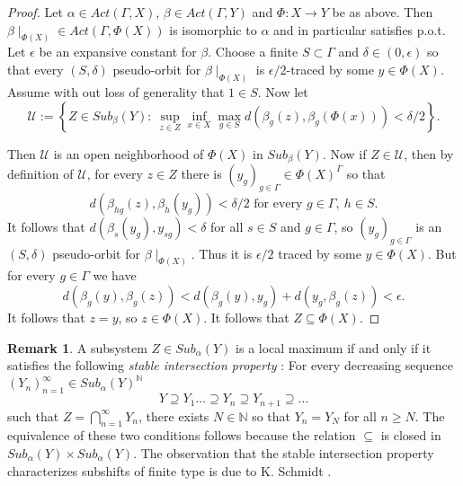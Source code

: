 \documentclass[oneside,english]{amsart}
\theoremstyle{definition}
\newtheorem{remark}[thm]{Remark}
\newcommand{\Act}[2]{\mathit{Act}({#1},{#2})}
\newcommand{\subG}[2]{\mathit{Sub}_{{#1}}({#2})}
\begin{document}
\begin{proof}
Let $\alpha \in \Act{\Gamma}{X}$, $\beta \in \Act{\Gamma}{Y}$ and $\Phi:X \to Y$ be as above.
Then $\beta\mid_{\Phi(X)} \in \Act{\Gamma}{\Phi(X)}$ is isomorphic to $\alpha$ and in particular satisfies p.o.t.
Let $\epsilon$ be an expansive constant for $\beta$. Choose  a finite $S \subset \Gamma$ and $\delta  \in (0,\epsilon)$ so that every $(S,\delta)$ pseudo-orbit for $\beta\mid_{\Phi(X)}$ is $\epsilon/2$-traced by some $y \in \Phi(X)$.
Assume with out loss of generality that $ 1 \in S$.
Now let
\begin{equation}
\mathcal{U}:= \left\{Z \in \subG{\beta}{Y}:~ \sup_{z \in Z}\inf_{ x \in X}\max_{g \in S}d(\beta_{g}(z),\beta_g(\Phi(x))) < \delta/2 \right\}.
\end{equation}

Then $\mathcal{U}$ is an open neighborhood of $\Phi(X)$ in $\subG{\beta}{Y}$.
Now if $Z \in \mathcal{U}$, then by definition of $\mathcal{U}$,
for every $z \in Z$ there is $(y_g)_{g \in \Gamma} \in \Phi(X)^\Gamma$  so that
$$d(\beta_{hg}(z),\beta_{h}(y_g)) < \delta/2 \mbox{ for every } g \in \Gamma,~ h \in S.$$
It follows that  $d(\beta_s(y_{g}),y_{sg})< \delta$ for all $s \in S$ and $g \in \Gamma$, so $(y_g)_{g \in \Gamma}$ is an $(S,\delta)$ pseudo-orbit for $\beta\mid_{\Phi(X)}$.
Thus it is $\epsilon/2$ traced by some  $y \in \Phi(X)$. But for every $g \in \Gamma$ we have
$$d(\beta_g(y),\beta_g(z))< d(\beta_g(y),y_g)+ d(y_g,\beta_g(z)) < \epsilon.$$
It follows that $z = y$, so $z \in \Phi(X)$. It follows that $Z \subseteq \Phi(X)$.

\end{proof}

\begin{remark}\label{rem:stable_intersection}
A subsystem $Z \in \subG{\alpha}{Y}$ is a local maximum if and only if  it satisfies the following \emph{stable intersection property
}: For every decreasing sequence $(Y_n)_{n=1}^\infty \in \subG{\alpha}{Y}^{\mathbb{N}}$
\begin{equation}\label{eq:dec_chain}
Y \supseteq Y_1 \ldots \supseteq Y_n \supseteq Y_{n+1} \supseteq \ldots
\end{equation}
such that $Z = \bigcap_{n=1}^\infty Y_n$,
 there exists $N \in\mathbb{N}$ so that $Y_{n}=Y_N$ for all $n \ge N$.
The equivalence of these two conditions follows because
the relation $\subseteq$ is closed in $\subG{\alpha}{Y} \times \subG{\alpha}{Y}$.
The observation that the stable intersection property characterizes subshifts of finite type is due to K. Schmidt \cite{MR3493309}.
\end{remark}
\end{document}

